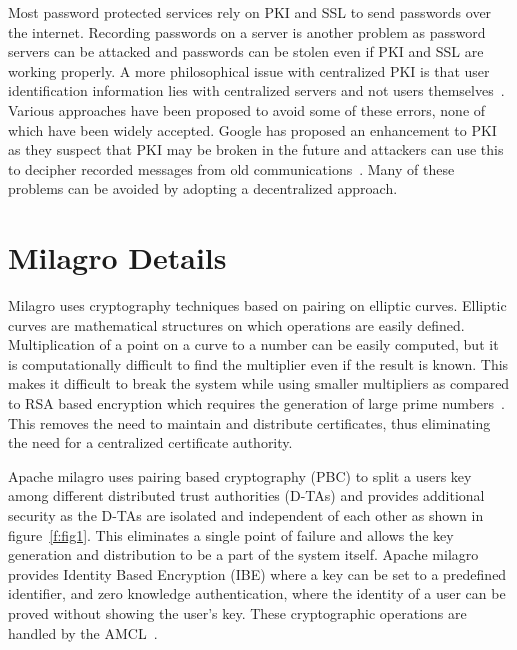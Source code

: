 Most password protected services rely on PKI and SSL to send passwords
over the internet. Recording passwords on a server is another problem
as password servers can be attacked and passwords can be stolen even
if PKI and SSL are working properly. A more philosophical issue with
centralized PKI is that user identification information lies with
centralized servers and not users
themselves~\cite{hid-sp18-503-distlab-pki-problems}. Various
approaches have been proposed to avoid some of these errors, none of
which have been widely accepted. Google has proposed an enhancement to
PKI as they suspect that PKI may be broken in the future and attackers
can use this to decipher recorded messages from old
communications~\cite{hid-sp18-503-securityweek-ssl-threats}.  Many of
these problems can be avoided by adopting a decentralized approach.


\section{Milagro Details}
Milagro uses cryptography techniques based on pairing on elliptic
curves. Elliptic curves are mathematical structures on which
operations are easily defined. Multiplication of a point on a curve to
a number can be easily computed, but it is computationally difficult
to find the multiplier even if the result is known. This makes it
difficult to break the system while using smaller multipliers as
compared to RSA based encryption which requires the generation of
large prime numbers~\cite{hid-sp18-503-milagro-concepts}. This removes
the need to maintain and distribute certificates, thus eliminating the
need for a centralized certificate authority.

Apache milagro uses pairing based cryptography (PBC) to split a users
key among different distributed trust authorities (D-TAs) and provides
additional security as the D-TAs are isolated and independent of each
other as shown in figure~\ref{f:fig1}. This eliminates a single point
of failure and allows the key generation and distribution to be a part
of the system itself. Apache milagro provides Identity Based
Encryption (IBE) where a key can be set to a predefined identifier,
and zero knowledge authentication, where the identity of a user can be
proved without showing the user's key.  These cryptographic operations
are handled by the AMCL~\cite{hid-sp18-503-milagro-concepts}.

